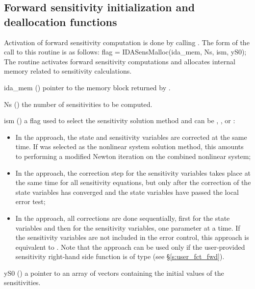 \subsection{Forward sensitivity initialization and deallocation functions}
\label{ss:sensi_malloc}
Activation of forward sensitivity computation is done by calling
.
The form of the call to this routine is as follows:
{
  flag = IDASensMalloc(ida\_mem, Ns, ism, yS0);
}
{
  The routine  activates forward sensitivity computations and
  allocates internal memory related to sensitivity calculations.
}
{
  \begin{args}

  \item[ida\_mem] ()
    pointer to the {\idas} memory block returned by .

  \item[Ns] () 
    the number of sensitivities to be computed.

  \item[ism] ()
    a flag used to select the sensitivity solution method and can 
    be , , or :
    \begin{itemize}
    \item In the  approach, the state and sensitivity variables are
      corrected at the same time. If  was selected as the nonlinear system 
      solution method, this amounts to performing a modified Newton iteration on the
      combined nonlinear system;
    \item In the  approach, the correction step for the sensitivity
      variables takes place at the same time for all sensitivity equations, but only after 
      the correction of the state variables has converged and the state variables 
      have passed the local error test; 
    \item In the  approach, all corrections are done sequentially, first
      for the state variables and then for the sensitivity variables, one parameter at
      a time. If the sensitivity variables are not included in the error control, this 
      approach is equivalent to . Note that the  approach 
      can be used only if the user-provided sensitivity right-hand side function is of type
       (see \S\ref{s:user_fct_fwd}).
    \end{itemize}

  \item[yS0] () 
    a pointer to an array of  vectors containing the initial 
    values of the sensitivities.

  \end{args}
}
